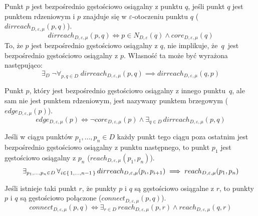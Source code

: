 \newline
Punkt $ p $ jest bezpośrednio gęstościowo osiągalny z punktu $ q $, jeśli punkt $ q $ jest punktem rdzeniowym i $ p $ znajduje się w $ \varepsilon $-otoczeniu punktu $ q $ ($ dirreach_{D,\varepsilon,\mu}(p, q) $).
\begin{equation} \label{direct-reachability}
	dirreach_{D,\varepsilon,\mu}(p, q) \iff p \in N_{D,\varepsilon}(q) \land core_{D,\varepsilon,\mu}(q)
\end{equation}
To, że $ p $ jest bezpośrednio gęstościowo osiągalny z $ q $, nie implikuje, \mbox{że $ q $ jest} bezpośrednio gęstościowo osiągalny z $ p $. Własność ta może być wyrażona następująco:
\begin{equation} \label{direct-reachability-asymmetry}
	\exists_D\;\neg\forall_{p,q\in D}\;dirreach_{D,\varepsilon,\mu}(p, q) \implies dirreach_{D,\varepsilon,\mu}(q, p)
\end{equation}

\newline
Punkt $ p $, który jest bezpośrednio gęstościowo osiągalny z innego \mbox{punktu $ q $}, ale sam nie jest punktem rdzeniowym, jest nazywany punktem brzegowym ($ edge_{D,\varepsilon,\mu}(p) $).
\begin{equation}\label{edge-point}
	edge_{D,\varepsilon,\mu}(p) \iff \neg core_{D,\varepsilon,\mu}(p) \land \exists_{q\in D}\, dirreach_{D,\varepsilon,\mu}(p,q)
\end{equation}

\newline
Jeśli w ciągu punktów $ p_1,\dots,p_n \in D $ każdy punkt tego ciągu poza ostatnim jest bezpośrednio gęstościowo osiągalny z punktu następnego, to punkt $ p_1 $ jest gęstościowo osiągalny z $ p_n $ ($ reach_{D,\varepsilon,\mu}(p_1, p_n) $).
\begin{equation}
	\exists_{p_1,\dots,p_n\in D}\,\forall_{i\in\set{1,\dots,n-1}}\,dirreach_{D,\varepsilon,\mu}(p_i, p_{i+1}) \implies reach_{D,\varepsilon,\mu}(p_1, p_n)
\end{equation}



\newline
Jeśli istnieje taki punkt $ r $, że punkty $ p $ i $ q $ są gęstościowo osiągalne z $ r $, to punkty $ p $ i $ q $ są gęstościowo połączone ($ connect_{D,\varepsilon,\mu}(p, q) $).
\begin{equation}
	connect_{D,\varepsilon,\mu}(p, q) \iff \exists_{r\in D}\,reach_{D,\varepsilon,\mu}(p, r) \land reach_{D,\varepsilon,\mu}(q, r)
\end{equation}

